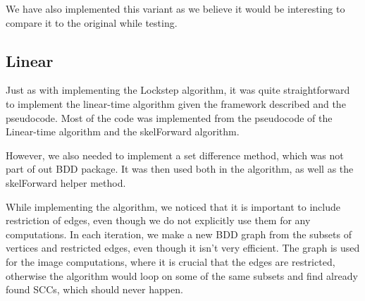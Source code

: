 \documentclass[../master/master.tex]{subfiles}
\begin{document}
We have also implemented this variant as we believe it would be interesting to compare it to the original while testing. 

\subsection{Linear}
Just as with implementing the Lockstep algorithm, it was quite straightforward to implement the linear-time algorithm given the framework described and the pseudocode. Most of the code was implemented from the pseudocode of the Linear-time algorithm and the skelForward algorithm.

However, we also needed to implement a set difference method, which was not part of out BDD package. It was then used both in the algorithm, as well as the skelForward helper method.

While implementing the algorithm, we noticed that it is important to include restriction of edges, even though we do not explicitly use them for any computations. In each iteration, we make a new BDD graph from the subsets of vertices and restricted edges, even though it isn't very efficient. The graph is used for the image computations, where it is crucial that the edges are restricted, otherwise the algorithm would loop on some of the same subsets and find already found SCCs, which should never happen.
\end{document}
